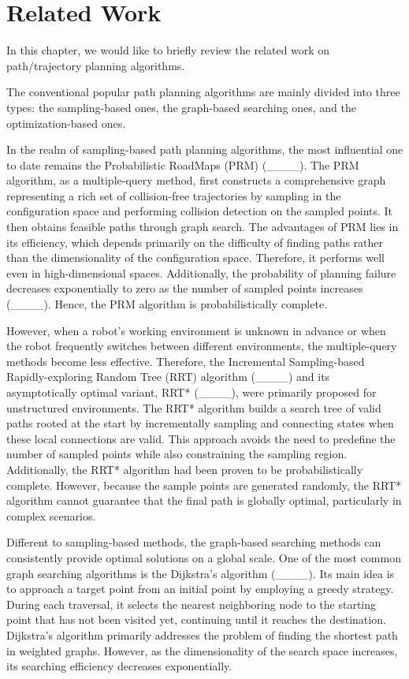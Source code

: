 \section{Related Work}
\label{Section2_RelatedWork}

In this chapter, we would like to briefly review the related work on path/trajectory planning algorithms.

The conventional popular path planning algorithms are mainly divided into three types: the sampling-based ones, the graph-based searching ones, and the optimization-based ones.

In the realm of sampling-based path planning algorithms, the most influential one to date remains the Probabilistic RoadMaps (PRM) (____). The PRM algorithm, as a multiple-query method, first constructs a comprehensive graph representing a rich set of collision-free trajectories by sampling in the configuration space and performing collision detection on the sampled points. It then obtains feasible paths through graph search. The advantages of PRM lies in its efficiency, which depends primarily on the difficulty of finding paths rather than the dimensionality of the configuration space. Therefore, it performs well even in high-dimensional spaces. Additionally, the probability of planning failure decreases exponentially to zero as the number of sampled points increases (____). Hence, the PRM algorithm is probabilistically complete.

However, when a robot's working environment is unknown in advance or when the robot frequently switches between different environments, the multiple-query methods become less effective. Therefore, the Incremental Sampling-based Rapidly-exploring Random Tree (RRT) algorithm (____) and its asymptotically optimal variant, RRT* (____), were primarily proposed for unstructured environments. The RRT* algorithm builds a search tree of valid paths rooted at the start by incrementally sampling and connecting states when these local connections are valid. This approach avoids the need to predefine the number of sampled points while also constraining the sampling region. Additionally, the RRT* algorithm had been proven to be probabilistically complete. However, because the sample points are generated randomly, the RRT* algorithm cannot guarantee that the final path is globally optimal, particularly in complex scenarios.

Different to sampling-based methods, the graph-based searching methods can consistently provide optimal solutions on a global scale. One of the most common graph searching algorithms is the Dijkstra's algorithm (____). Its main idea is to approach a target point from an initial point by employing a greedy strategy. During each traversal, it selects the nearest neighboring node to the starting point that has not been visited yet, continuing until it reaches the destination. Dijkstra's algorithm primarily addresses the problem of finding the shortest path in weighted graphs. However, as the dimensionality of the search space increases, its searching efficiency decreases exponentially.

